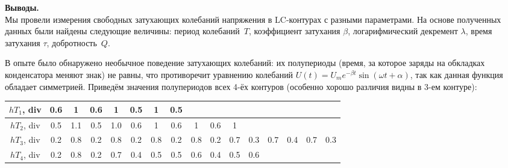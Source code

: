 \documentclass[ a4paper]{article}
\begin{document}
{\parindent=0pt\textbf{Выводы.}}\\
Мы провели измерения свободных затухающих колебаний напряжения в LC-контурах с разными параметрами. 
На основе полученных данных были найдены следующие величины: период колебаний~$T$, коэффициент затухания $\beta$, 
логарифмический декремент $\lambda$, время затухания $\tau$, добротность~$Q$.

В опыте было обнаружено необычное  поведение затухающих колебаний: их полупериоды (время, за которое заряды на обкладках конденсатора меняют знак) 
не равны, что противоречит уравнению колебаний $U(t)=U_me^{-\beta t}\sin(\omega t + \alpha)$, так как данная функция обладает симметрией. 
Приведём значения полупериодов всех 4-ёх контуров (особенно хорошо различия видны в 3-ем контуре):
\begin{center}
	\begin{tabular}{|c|c|c|c|c|c|c|c|c|c|c|c|c|c|c|c|}
		\hline
		$hT_1$, div&  0.6& 1 & 0.6& 1 & 0.5& 1 & 0.5& & & & & & && \\
		\hline
		$hT_2$, div&  0.5& 1.1& 0.5& 1.0 & 0.6& 1 & 0.6& 1 & 0.6& 1 & & & && \\
		\hline
		$hT_3$, div& 0.2& 0.8& 0.2& 0.8& 0.2& 0.8& 0.2& 0.8& 0.2& 0.7& 0.3& 0.7& 0.4& 0.7& 0.3 \\
		\hline
		$hT_4$, div&0.2& 0.8& 0.2& 0.7& 0.4& 0.5& 0.5& 0.6& 0.4& 0.5& 0.6& & & &\\
		\hline
	\end{tabular}
\end{center}
\end{document}
